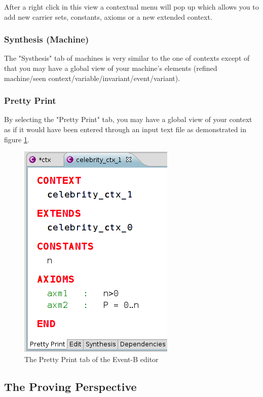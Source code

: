 After a right click in this view a contextual menu will pop up which allows you to add new carrier sets, constants, axioms or a new extended context. 

\subsubsection{Synthesis (Machine)}

The "Systhesis" tab of machines is very similar to the one of contexts except of that you may have a global view of your machine's elements (refined machine/seen context/variable/invariant/event/variant).

\subsubsection{Pretty Print}

By selecting the "Pretty Print" tab, you may have a global view of your context as if it would have been entered through an input text file as demonstrated in figure \ref{fig_ref_01_eventb_editor10}.

\begin{figure}[!h]
\begin{center}
	\includegraphics{img/reference/ref_01_eventb_editor10.png}
	\caption{The Pretty Print tab of the Event-B editor}
	\label{fig_ref_01_eventb_editor10}
\end{center}
\end{figure}

\subsection{The Proving Perspective}
\label{ref_01_proving_perspective}

